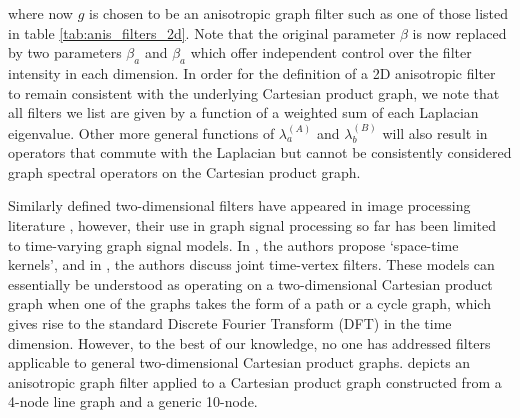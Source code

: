 where now $g$ is chosen to be an anisotropic graph filter such as one of those listed in table \ref{tab:anis_filters_2d}. Note that the original parameter $\beta$ is now replaced by two parameters $\beta_a$ and $\beta_a$ which offer independent control over the filter intensity in each dimension. In order for the definition of a 2D anisotropic filter to remain consistent with the underlying Cartesian product graph, we note that all filters we list are given by a function of a weighted sum of each Laplacian eigenvalue. Other more general functions of $\lambda^{(A)}_a$ and $\lambda^{(B)}_b$ will also result in operators that commute with the Laplacian but cannot be consistently considered graph spectral operators on the Cartesian product graph. 

Similarly defined two-dimensional filters have appeared in image processing literature \citep{Aubert2006}, however, their use in graph signal processing so far has been limited to time-varying graph signal models. In \cite{Romero2017}, the authors propose `space-time kernels', and in \cite{Grassi2018, Isufi2017, Loukas2016, Jiang2021}, the authors discuss joint time-vertex filters. These models can essentially be understood as operating on a two-dimensional Cartesian product graph when one of the graphs takes the form of a path or a cycle graph, which gives rise to the standard Discrete Fourier Transform (DFT) in the time dimension. However, to the best of our knowledge, no one has addressed filters applicable to general two-dimensional Cartesian product graphs.  depicts an anisotropic graph filter applied to a Cartesian product graph constructed from a 4-node line graph and a generic 10-node. 


